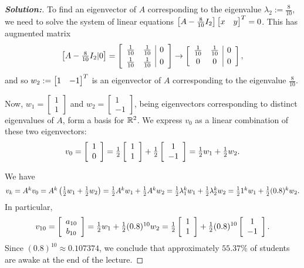 \documentclass[a4paper]{amsart}
\theoremstyle{definition}
\newenvironment{solution}{\begin{proof}[\textbf{Solution:}] \vphantom{u}}{\end{proof}}
\begin{document}
\begin{solution}
 To find an eigenvector of $A$ corresponding to the eigenvalue
 $\lambda_2 := \frac{8}{10}$, we need to solve the system of linear
 equations
 $\left[A -{\textstyle \frac{8}{10}} I_2\right]\left[\begin{matrix} x & y \end{matrix}\right]^T = 0$. This has
 augmented matrix
 $$
 \left[\begin{matrix} A -{\textstyle \frac{8}{10}} I_2|0 \end{matrix}\right] =
 \left[\begin{array}{cc|c} \frac{1}{10} & \frac{1}{10} & 0\\[3pt]
 \frac{1}{10}
 & \frac{1}{10} & 0\end{array} \right] \to
  \left[\begin{array}{cc|c} \frac{1}{10} & \frac{1}{10} & 0\\[2pt]
 0
 & 0 & 0\end{array} \right],
 $$
 and so $w_2 :=\left[\begin{matrix} 1 & -1\end{matrix}\right]^T$ is an eigenvector of $A$ corresponding to
 the eigenvalue $\frac{8}{10}$.

 Now, $w_1 = \left[\begin{array}{c} 1 \\ 1 \end{array}\right]$
 and $w_2 = \left[\begin{array}{c} 1 \\ -1 \end{array}\right]$, being
 eigenvectors corresponding to distinct eigenvalues of $A$, form a
 basis for ${\mathbb{R}}^2$. We express $v_0$ as a linear combination of these
 two eigenvectors:
 $$
 v_0 =\left[\begin{array}{cc} 1\\ 0 \end{array}\right] = {\textstyle
 \tfrac{1}{2}}\left[\begin{array}{c} 1 \\ 1 \end{array}\right] +
 {\textstyle \tfrac{1}{2}}\left[\begin{array}{c} 1 \\ -1
 \end{array}\right] = {\textstyle \tfrac{1}{2} w_1 + \tfrac{1}{2} w_2}.
 $$

 We have
 $${\textstyle v_k = A^kv_0 =
    A^k\left(\tfrac{1}{2} w_1 + \tfrac{1}{2} w_2\right) =
    \tfrac{1}{2} A^kw_1 + \tfrac{1}{2} A^kw_2 =
    \tfrac{1}{2}\lambda_1^kw_1 + \tfrac{1}{2}\lambda_2^kw_2 =
    \tfrac{1}{2} 1^kw_1 + \tfrac{1}{2}(0.8)^kw_2}.
 $$ In particular,
 $$
  v_{10} = \left[\begin{array}{cc} a_{10}\\ b_{10} \end{array}\right] =
 {\textstyle \tfrac{1}{2} w_1 + \tfrac{1}{2}(0.8)^{10}w_2} =
 {\textstyle \tfrac{1}{2}}
    \left[\begin{array}{c} 1 \\ 1 \end{array}\right] +
 {\textstyle \tfrac{1}{2}}(0.8)^{10}
    \left[\begin{array}{c} 1 \\ -1 \end{array}\right].
 $$
 Since $(0.8)^{10} \approx 0.107374$, we conclude that
 approximately $55.37\%$ of students are awake at the end of the
 lecture.
\end{solution}
\end{document}
